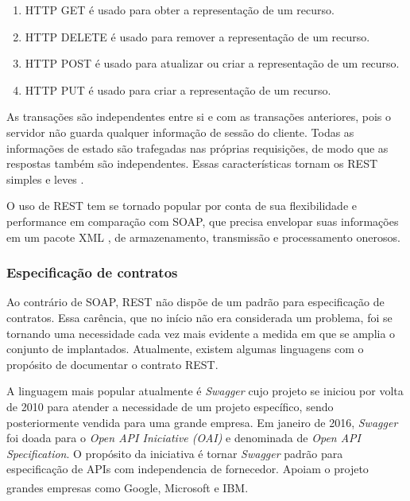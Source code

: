 \begin{enumerate}
\item HTTP GET é usado para obter a representação de um recurso.
\item HTTP DELETE é usado para remover a representação de um recurso.
\item HTTP POST é usado para atualizar ou criar a representação de um recurso.
\item HTTP PUT é usado para criar a representação de um recurso.
\end{enumerate}

As transações são independentes entre si e com as transações anteriores, pois o
servidor não guarda qualquer informação de sessão do cliente. Todas as
informações de estado são trafegadas nas próprias requisições, de modo que as
respostas também são independentes. Essas características tornam os \wss{} REST
simples e leves \cite{mumbaikar2013web}.

O uso de REST tem se tornado popular por conta de sua flexibilidade e
performance em comparação com SOAP, que precisa envelopar suas informações em
um pacote XML \cite{mumbaikar2013web}, de armazenamento, transmissão e
processamento onerosos.

\subsubsection{Especificação de contratos}
\vspace{-6mm}

Ao contrário de SOAP, REST não dispõe de um padrão para especificação de
contratos. Essa carência, que no início não era considerada um problema, foi se
tornando uma necessidade cada vez mais evidente a medida em que se amplia o
conjunto de \wss{} implantados. Atualmente, existem algumas linguagens com o
propósito de documentar o contrato REST.

A linguagem mais popular atualmente é \textit{Swagger} cujo projeto se iniciou
por volta de 2010 para atender a necessidade de um projeto específico, sendo posteriormente
vendida para uma grande empresa. Em janeiro de 2016, \textit{Swagger} foi doada
para o \textit{Open API Iniciative (OAI)} e denominada de \textit{Open API
Specification}. O propósito da iniciativa é tornar \textit{Swagger} padrão para
especificação de APIs com independencia de fornecedor. Apoiam o projeto grandes
empresas como Google\textsuperscript{\textregistered},
Microsoft\textsuperscript{\textregistered} e
IBM\textsuperscript{\textregistered}.

